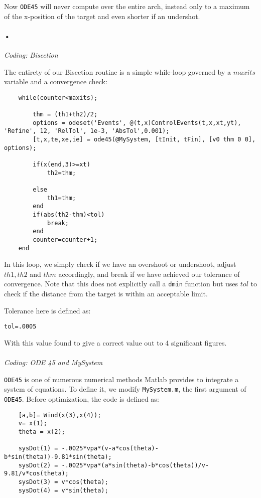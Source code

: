 \documentclass[12pt]{article}
\begin{document}
\begin{enumerate}
{Now \texttt{ODE45} will never compute over the entire arch, instead only to a maximum of the x-position of the target and even shorter if an undershot.

}
\paragraph{•}
\large{\item\textit{Coding: Bisection}}
\normalsize{The entirety of our Bisection routine is a simple while-loop governed by a $maxits$ variable and a convergence check:
\begin{verbatim}
    while(counter<maxits);
    
        thm = (th1+th2)/2;
        options = odeset('Events', @(t,x)ControlEvents(t,x,xt,yt), 'Refine', 12, 'RelTol', 1e-3, 'AbsTol',0.001);
        [t,x,te,xe,ie] = ode45(@MySystem, [tInit, tFin], [v0 thm 0 0], options);
        
        if(x(end,3)>=xt)
            th2=thm;

        else
            th1=thm;
        end
        if(abs(th2-thm)<tol)
            break;
        end
        counter=counter+1;
    end
\end{verbatim}
In this loop, we simply check if we have an overshoot or undershoot, adjust $th1, th2$ and $thm$ accordingly, and break if we have achieved our tolerance of convergence.  Note that this does not explicitly call a \texttt{dmin} function but uses $tol$ to check if the distance from the target is within an acceptable limit.}  Tolerance here is defined as:
\centerline{\texttt{tol=.0005}}

With this value found to give a correct value out to 4 significant figures.
\paragraph{}
\large{\item\textit{Coding: ODE 45 and MySystem}}

\normalsize{\texttt{ODE45} is one of numerous numerical methods Matlab provides to integrate a system of equations.  To define it, we modify \texttt{MySystem.m}, the first argument of \texttt{ODE45}.  Before optimization, the code is defined as:
\begin{verbatim}
    [a,b]= Wind(x(3),x(4));
    v= x(1);
    theta = x(2);
    
    sysDot(1) = -.0025*vpa*(v-a*cos(theta)-b*sin(theta))-9.81*sin(theta);
    sysDot(2) = -.0025*vpa*(a*sin(theta)-b*cos(theta))/v-9.81/v*cos(theta);
    sysDot(3) = v*cos(theta);
    sysDot(4) = v*sin(theta);
\end{verbatim}

}
\end{enumerate}
\end{document}
